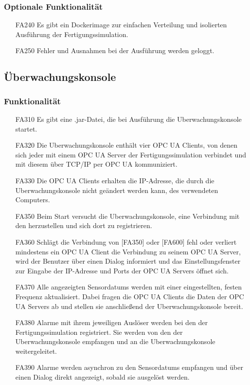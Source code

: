 \documentclass[parskip=full]{scrartcl}
\begin{document}
\subsubsection{Optionale Funktionalität}
\label{fertigung-optional}
\begin{enumerate}
  \item[FA240] Es gibt ein \gls{Dockerimage} zur einfachen Verteilung und isolierten Ausführung der \gls{Fertigungssimulation}.
  \item[FA250] Fehler und Ausnahmen bei der Ausführung werden geloggt.
\end{enumerate}

\subsection{Überwachungskonsole}
\subsubsection{Funktionalität}
\begin{enumerate}
  \item[FA310] Es gibt eine .jar-Datei, die bei Ausführung die \gls{Uberwachungskonsole} startet.
  \item[FA320] Die \gls{Uberwachungskonsole} enthält vier \glspl{OPC UA Client}, von denen sich jeder mit einem \gls{OPC UA Server} der \gls{Fertigungssimulation} verbindet und mit diesem über \gls{TCP/IP} per \gls{OPC UA} kommuniziert.
  \item[FA330] Die \glspl{OPC UA Client} erhalten die \gls{IP-Adresse}, die durch die \gls{Uberwachungskonsole} nicht geändert werden kann, des verwendeten Computers.
  \item[FA350] Beim Start versucht die \gls{Uberwachungskonsole}, eine Verbindung mit den  herzustellen und sich dort zu registrieren.
  \item[FA360] Schlägt die Verbindung von [FA350] oder [FA600] fehl oder verliert mindestens ein \gls{OPC UA Client} die Verbindung zu seinem \gls{OPC UA Server}, wird der Benutzer über einen Dialog informiert und das Einstellungsfenster zur Eingabe der \gls{IP-Adresse} und Ports der \glspl{OPC UA Server} öffnet sich.
  \item[FA370] Alle angezeigten \glspl{Sensordatum} werden mit einer eingestellten, festen Frequenz aktualisiert. Dabei fragen die \glspl{OPC UA Client} die Daten der \glspl{OPC UA Server}
    ab und stellen sie anschlie{\ss}end der \gls{Uberwachungskonsole} bereit.
  \item[FA380] Alarme mit ihrem jeweiligen Auslöser werden bei den  der \gls{Fertigungssimulation} registriert. Sie werden von den
     der \gls{Uberwachungskonsole} empfangen und an die \gls{Uberwachungskonsole} weitergeleitet.
  \item[FA390] Alarme werden asynchron zu den \glspl{Sensordatum} empfangen und über einen Dialog direkt angezeigt, sobald sie ausgelöst werden.
\end{enumerate}
\end{document}
